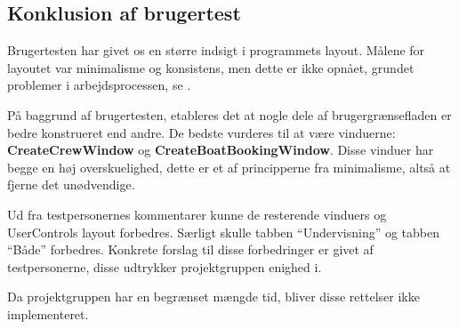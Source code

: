 \subsection{Konklusion af brugertest}
Brugertesten har givet os en større indsigt i programmets layout.
Målene for layoutet var minimalisme og konsistens, men dette er ikke opnået, grundet problemer i arbejdsprocessen, se .

På baggrund af brugertesten, etableres det at nogle dele af brugergrænsefladen er bedre konstrueret end andre.
De bedste vurderes til at være vinduerne: \textbf{CreateCrewWindow} og \textbf{CreateBoatBookingWindow}. 
Disse vinduer har begge en høj overskuelighed, dette er et af principperne fra minimalisme, altså at fjerne det unødvendige. 

Ud fra testpersonernes kommentarer kunne de resterende vinduers og UserControls layout forbedres. 
Særligt skulle tabben ``Undervisning'' og tabben ``Både'' forbedres.
Konkrete forslag til disse forbedringer er givet af testpersonerne, disse udtrykker projektgruppen enighed i. 

Da projektgruppen har en begrænset mængde tid, bliver disse rettelser ikke implementeret. 
